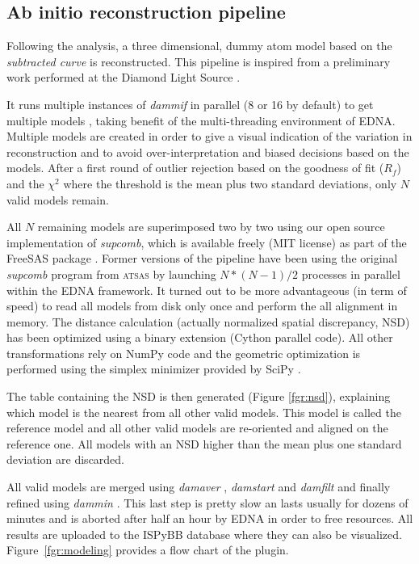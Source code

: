 \documentclass[preprint,pdf]{iucr}              %
\begin{document}
\subsection{Ab initio reconstruction pipeline}
\label{abinitio}
Following the analysis, a three dimensional, dummy atom model based
on the \textit{subtracted curve} is reconstructed.
This pipeline is inspired from a preliminary work
performed at the Diamond Light Source \cite{DiamondSE}.

It runs multiple instances of \textit{dammif} in parallel (8 or 16 by default)
to get multiple models \cite{dammif}, taking benefit of the multi-threading
environment of EDNA.
Multiple models are created in order to give a visual indication of the variation in
reconstruction and to avoid over-interpretation and biased decisions based on
the models.
After a first round of outlier rejection based on the goodness of fit ($R_{f}$)
and the $\chi^{2}$ where the threshold is the mean plus two standard
deviations, only $N$ valid models remain.

All $N$ remaining models are superimposed two by two using
our open source implementation of \textit{supcomb}, which is available freely
(MIT license) as part of the FreeSAS package \cite{freesas}.
Former versions of the pipeline have been using the original
\textit{supcomb} \cite{supcomb} program from \textsc{atsas} by launching
$N*(N-1)/2$ processes in parallel within the EDNA framework.
It turned out to be more advantageous (in term of speed) to read all models
from disk only once and perform the all alignment in memory.
The distance calculation (actually normalized spatial discrepancy, NSD) has
been optimized using a binary extension (Cython parallel code).
All other transformations rely on NumPy \cite{numpy} code and the geometric
optimization is performed using the simplex minimizer provided by SciPy \cite{scipy}.

The table containing the NSD is then generated
(Figure \ref{fgr:nsd}), explaining which model is the nearest from all other
valid models. This model is called the reference model and all other valid
models are re-oriented and aligned on the reference one.
All models with an NSD higher than the mean plus one standard deviation are
discarded.

All valid models are merged using \textit{damaver} \cite{damaver}, \textit{damstart} and
\textit{damfilt} and finally refined using \textit{dammin} \cite{dammin}.
This last step is pretty slow an lasts usually for dozens of minutes and is
aborted after half an hour by EDNA in order to free resources.
All results are uploaded to the ISPyBB database where they can also be
visualized. Figure~\ref{fgr:modeling} provides a flow chart of the plugin.
\end{document}
